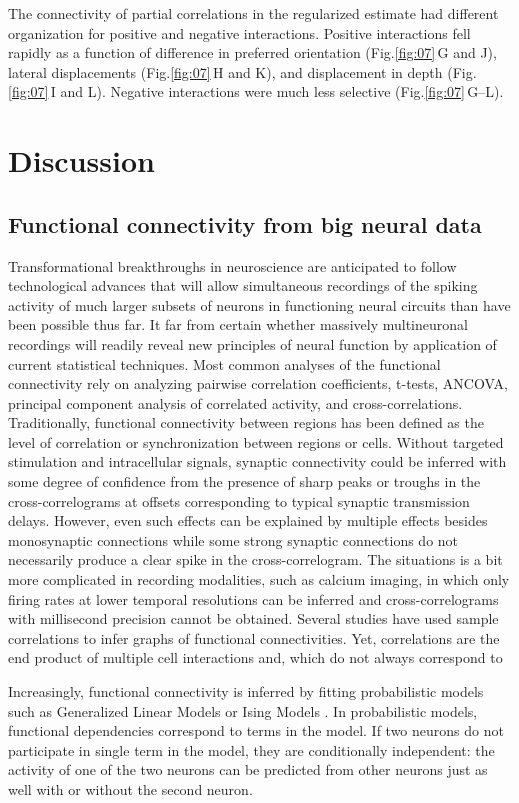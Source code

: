 \documentclass[10pt]{article}
\begin{document}
The connectivity of partial correlations in the regularized estimate had different organization for positive and negative interactions. Positive interactions fell rapidly as a function of difference in preferred orientation (Fig.\;\ref{fig:07}\,G and J), lateral displacements (Fig.\;\ref{fig:07}\,H and K), and displacement in depth (Fig.\;\ref{fig:07}\,I and L). Negative interactions were much less selective (Fig.\;\ref{fig:07}\,G--L).


\section*{Discussion}
\subsection*{Functional connectivity from big neural data}
Transformational breakthroughs in neuroscience are anticipated to follow technological advances that will allow simultaneous recordings of the spiking activity of much larger subsets of neurons in functioning neural circuits than have been possible thus far. It far from certain whether massively multineuronal recordings will readily reveal new principles of neural function by application of current statistical techniques. Most common analyses of the functional connectivity rely on analyzing pairwise correlation coefficients, t-tests, ANCOVA, principal component analysis of correlated activity, and cross-correlations.  Traditionally, functional connectivity between regions has been defined as the level of correlation or synchronization between regions or cells. Without targeted stimulation and intracellular signals, synaptic connectivity could be inferred with some degree of confidence from the presence of sharp peaks or troughs in the cross-correlograms at offsets corresponding to typical synaptic transmission delays. However, even such effects can be explained by multiple effects besides monosynaptic connections while some strong synaptic connections do not necessarily produce a clear spike in the cross-correlogram. The situations is a bit more complicated in recording modalities, such as calcium imaging, in which only firing rates at lower temporal resolutions can be inferred and cross-correlograms with millisecond precision cannot be obtained. Several studies have used sample correlations to infer graphs of functional connectivities. Yet, correlations are the end product of multiple cell interactions and, which do not always correspond to 

Increasingly, functional connectivity is inferred by fitting probabilistic models such as Generalized Linear Models \cite{Pillow:2008} or Ising Models \cite{Schneidman:2006,Tkacik:2006,Tang:2008,Shlens:2009}. In probabilistic models, functional dependencies correspond to terms in the model. If two neurons do not participate in single term in the model, they are conditionally independent: the activity of one of the two neurons can be predicted from other neurons just as well with or without the second neuron. 
\end{document}
